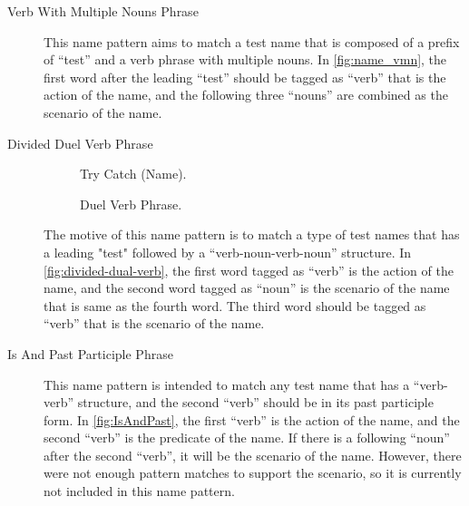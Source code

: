 \documentclass[proposal.tex]{subfiles}
\begin{document}
\begin{description}

\item[Verb With Multiple Nouns Phrase]

This name pattern aims to match a test name that is composed of a prefix of \enquote{test} and a verb phrase with multiple nouns.
%
In \cref{fig:name_vmn}, the first word after the leading \enquote{test} should be tagged as \enquote{verb} that is the action of the name, and the following three \enquote{nouns} are combined as the scenario of the name.

\item[Divided Duel Verb Phrase]



\begin{figure}[t]
\centering
    \begin{subfigure}{0.65\textwidth}
    \end{subfigure}
\caption{Try Catch (Name).}
\label{fig:try-catch}
\end{figure}

\begin{figure}[t]
\centering
    \begin{subfigure}{0.65\textwidth}
    \end{subfigure}
\caption{Duel Verb Phrase.}
\label{fig:dual-verb}
\end{figure}


The motive of this name pattern is to match a type of test names that has a leading "test" followed by a \enquote{verb-noun-verb-noun} structure.
%
In \cref{fig:divided-dual-verb}, the first word tagged as \enquote{verb} is the action of the name, and the second word tagged as \enquote{noun} is the scenario of the name that is same as the fourth word.
%
The third word should be tagged as \enquote{verb} that is the scenario of the name.

\item[Is And Past Participle Phrase]


This name pattern is intended to match any test name that has a \enquote{verb-verb} structure, and the second \enquote{verb} should be in its past participle form.
%
In \cref{fig:IsAndPast}, the first \enquote{verb} is the action of the name, and the second \enquote{verb} is the predicate of the name.
%
If there is a following \enquote{noun} after the second \enquote{verb}, it will be the scenario of the name.
%
However, there were not enough pattern matches to support the scenario, so it is currently not included in this name pattern. 



\end{description}
\end{document}
